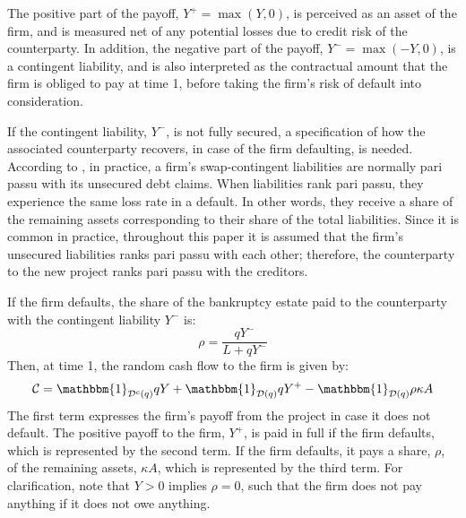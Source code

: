 \documentclass[main.tex]{subfiles}
\begin{document}
        The positive part of the payoff, $Y^{+}=\max\left(Y,0\right)$, is perceived as an asset of the firm, and is measured net of any potential losses due to credit risk of the counterparty.
        In addition, the negative part of the payoff, $Y^{-} = \max \left(-Y,0\right)$, is a contingent liability, and is also interpreted as the contractual amount that the firm is obliged to pay at time 1, before taking the firm's risk of default into consideration.

        If the contingent liability, $Y^{-}$, is not fully secured, a specification of how the associated counterparty recovers, in case of the firm defaulting, is needed.
        According to \textcite{ADS2019}, in practice, a firm's swap-contingent liabilities 
        are normally pari passu with its unsecured debt claims.
        When liabilities rank pari passu, they experience the same loss rate in a default.
        In other words, they receive a share of the remaining assets 
        corresponding to their share of the total liabilities.
        Since it is common in practice, throughout this paper it is assumed that the firm's 
        unsecured liabilities ranks pari passu with each other;
        therefore, the counterparty to the new project ranks pari passu with the creditors.

        If the firm defaults, the share of the bankruptcy estate paid to the counterparty with 
        the contingent liability $Y^{-}$ is:
            \begin{equation*}
                \rho = 
                \frac{
                    qY^{-}
                }{
                    L + qY^{-}
                } 
            \end{equation*}
        Then, at time 1, the random cash flow to the firm is given by:
        \begin{equation}
            \mathcal{C} 
            = 
            \mathbbm{1}_{\mathcal{D}^{c}(q)} qY
            + \mathbbm{1}_{\mathcal{D}(q)} qY^{+}
            - \mathbbm{1}_{\mathcal{D}(q)} \rho \kappa A
        \end{equation}
        The first term expresses the firm's payoff from the project in case it does not default. 
        The positive payoff to the firm, $Y^{+}$, is paid in full if the firm defaults,
        which is represented by the second term.
        If the firm defaults, it pays a share, $\rho$, of the remaining assets, $\kappa A$,
        which is represented by the third term.
        For clarification, note that $Y > 0$ implies $\rho=0$, 
        such that the firm does not pay anything if it does not owe anything.
\end{document}
